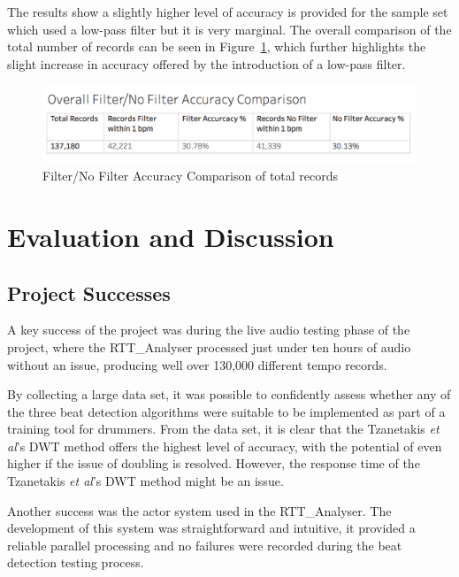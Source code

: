 \documentclass[a4paper, 11pt]{article}
\begin{document}
The results show a slightly higher level of accuracy is provided for the sample set which used a low-pass filter but it is very marginal. The overall comparison of the total number of records can be seen in Figure~\ref{fig: overFilAcc}, which further highlights the slight increase in accuracy offered by the introduction of a low-pass filter. 

\begin{figure}[ht]
\centering
\vspace{-1in}
\includegraphics[scale=0.3]{images/OverFilAc.jpg}
\caption{Filter/No Filter Accuracy Comparison of total records}
\label{fig: overFilAcc}
\end{figure}

\clearpage
\maketitle \section{Evaluation and Discussion}

\subsection{Project Successes}

A key success of the project was during the live audio testing phase of the project, where the RTT\_Analyser processed just under ten hours of audio without an issue, producing well over 130,000 different tempo records.

By collecting a large data set, it was possible to confidently assess whether any of the three beat detection algorithms were suitable to be implemented as part of a training tool for drummers. From the data set, it is clear that the Tzanetakis \textit{et al}'s \cite{tzane1} DWT method offers the highest level of accuracy, with the potential of even higher if the issue of doubling is resolved. However, the response time of the Tzanetakis \textit{et al}'s \cite{tzane1} DWT method might be an issue. \par 

Another success was the actor system used in the RTT\_Analyser. The development of this system was straightforward and intuitive, it provided a reliable parallel processing and no failures were recorded during the beat detection testing process. 
\end{document}
